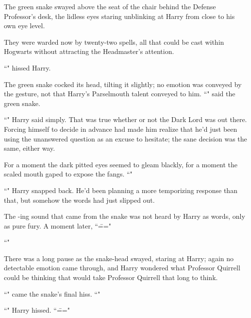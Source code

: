 The green snake swayed above the seat of the chair behind the Defense Professor's desk, the lidless eyes staring unblinking at Harry from close to his own eye level.

They were warded now by twenty-two spells, all that could be cast within Hogwarts without attracting the Headmaster's attention.

``" hissed Harry.

The green snake cocked its head, tilting it slightly; no emotion was conveyed by the gesture, not that Harry's Parselmouth talent conveyed to him. ``" said the green snake.

``" Harry said simply. That was true whether or not the Dark Lord was out there. Forcing himself to decide in advance had made him realize that he'd just been using the unanswered question as an excuse to hesitate; the sane decision was the same, either way.

For a moment the dark pitted eyes seemed to gleam blackly, for a moment the scaled mouth gaped to expose the fangs. ``"

``" Harry snapped back. He'd been planning a more temporizing response than that, but somehow the words had just slipped out.

The -ing sound that came from the snake was not heard by Harry as words, only as pure fury. A moment later, ``\==="

``"

There was a long pause as the snake-head swayed, staring at Harry; again no detectable emotion came through, and Harry wondered what Professor Quirrell could be thinking that would take Professor Quirrell that long to think.

``" came the snake's final hiss. ``"

``" Harry hissed. ``\==="


